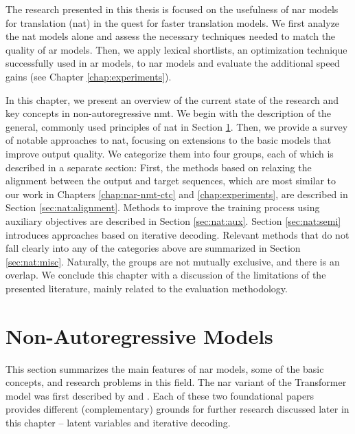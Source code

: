 The research presented in this thesis is focused on the usefulness of \ac{nar}
models for translation (\acs{nat}) in the quest for faster
translation models. We first analyze the \ac{nat} models alone and assess the
necessary techniques needed to match the quality of \ac{ar} models.  Then, we
apply lexical shortlists, an optimization technique successfully used in
\ac{ar} models, to \ac{nar} models and evaluate the additional speed gains (see
Chapter \ref{chap:experiments}).

In this chapter, we present an overview of the current state of the research
and key concepts in non-autoregressive \ac{nmt}. We begin with the description
of the general, commonly used principles of \ac{nat} in Section
\ref{sec:nat:principles}. Then, we provide a survey of notable approaches to
\ac{nat}, focusing on extensions to the basic models that improve output
quality. We categorize them into four groups, each of which is described in a
separate section: First, the methods based on relaxing the alignment between
the output and target sequences, which are most similar to our work in Chapters
\ref{chap:nar-nmt-ctc} and \ref{chap:experiments}, are described in Section
\ref{sec:nat:alignment}. Methods to improve the training process using
auxiliary objectives are described in Section \ref{sec:nat:aux}. Section
\ref{sec:nat:semi} introduces approaches based on iterative decoding. Relevant
methods that do not fall clearly into any of the categories above are
summarized in Section \ref{sec:nat:misc}. Naturally, the groups are not
mutually exclusive, and there is an overlap. We conclude this chapter with a
discussion of the limitations of the presented literature, mainly related to
the evaluation methodology.


\section{Non-Autoregressive Models}%
\label{sec:nat:principles}

This section summarizes the main features of \ac{nar} models, some of the basic
concepts, and research problems in this field. The \ac{nar} variant of the
Transformer model was first described by \citet{gu2017nonautoregressive} and
\citet{lee-etal-2018-deterministic}. Each of these two foundational papers
provides different (complementary) grounds for further research discussed later
in this chapter -- latent variables and iterative decoding.

